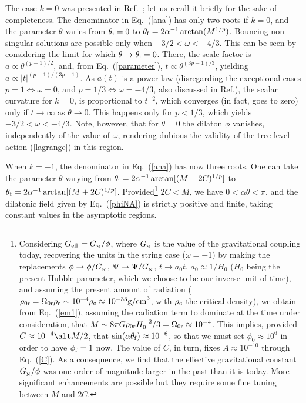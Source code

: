\documentclass[a4paper,aps,twocolumn,prd,showpacs,nofootinbib]{revtex4}
\newcommand{\GN}{G_{_{\rm N}}}
\begin{document}
The case $k=0$ was presented in Ref.~\cite{picco}; let us recall it
briefly for the sake of completeness.  The denominator in
Eq.~(\ref{ana}) has only two roots if $k=0$, and the parameter
$\theta$ varies from $\theta_{\rm i} =0$ to $\theta_{\rm f} =
2\alpha^{-1}\arctan(M^{1/p})$. Bouncing non singular solutions are
possible only when $-3/2 < \omega < -4/3$. This can be seen by
considering the limit for which $\theta \to \theta_{\rm i}=0$. There,
the scale factor is $a\propto\theta^{(p-1)/2}$, and, from
Eq.~(\ref{parameter}), $t\propto \theta^{(3p-1)/3}$, yielding
$a\propto |t|^{(p-1)/(3p-1)}$. As $a(t)$ is a power law (disregarding
the exceptional cases $p=1\Leftrightarrow\omega=0$, and
$p=1/3\Leftrightarrow\omega = -4/3$, also discussed in
Ref.\cite{picco}), the scalar curvature for $k=0$, is proportional to
$t^{-2}$, which converges (in fact, goes to zero) only if $t \to
\infty$ as $\theta \to 0$. This happens only for $p<1/3$, which yields
$-3/2 < \omega < -4/3$.  Note, however, that for $\theta=0$ the
dilaton $\phi$ vanishes, independently of the value of $\omega$,
rendering dubious the validity of the tree level action
(\ref{lagrange}) in this region.

When $k = -1$, the denominator in Eq.~(\ref{ana}) has now three
roots. One can take the parameter $\theta$ varying from $\theta_{\rm
i} =2\alpha^{-1}\arctan[(M-2C)^{1/p}]$ to $\theta_{\rm f} =
2\alpha^{-1}\arctan[(M+2C)^{1/p}]$. Provided\footnote{Considering
$G_{\rm eff} = \GN/\phi$, where $\GN$ is the value of the
gravitational coupling today, recovering the units in the string case
($\omega =-1$) by making the replacements $\phi \rightarrow \phi/\GN$,
$\Psi \rightarrow \Psi/\GN$, $t\rightarrow a_0 t$, $a_0 \approx 1/H_0$
($H_0$ being the present Hubble parameter, which we choose to be our
inverse unit of time), and assuming the present amount of radiation
($\rho _{0{\rm r}} = \Omega_{0{\rm r}} \rho_{\rm c} \sim 10^{-4}
\rho_{\rm c} \approx 10^{-33} {\rm g/cm}^3$, with $\rho_{\rm c}$ the
critical density), we obtain from Eq.~(\ref{em1}), assuming the
radiation term to dominate at the time under consideration, that
$M\sim 8\pi G \rho_{0{\rm r}} H_0^{-2}/3 = \Omega_{0{\rm r}} \approx
10^{-4}$. This implies, provided $C\approx 10^{-4}\alt M/2$, that
$\sin(\alpha\theta_{\rm f})\approx 10^{-6}$, so that we must set
$\phi_0\approx 10^{6}$ in order to have $\phi_{\rm f} =1$ now. The
value of $C$, in turn, fixes $A\approx 10^{-10}$ through
Eq.~(\ref{C}). As a consequence, we find that the effective
gravitational constant $\GN/\phi$ was one order of magnitude larger in
the past than it is today. More significant enhancements are possible
but they require some fine tuning between $M$ and $2C$.} $2C < M$, we
have $0 < \alpha\theta < \pi$, and the dilatonic field given by
Eq.~(\ref{phiNA}) is strictly positive and finite, taking constant
values in the asymptotic regions.
\end{document}
